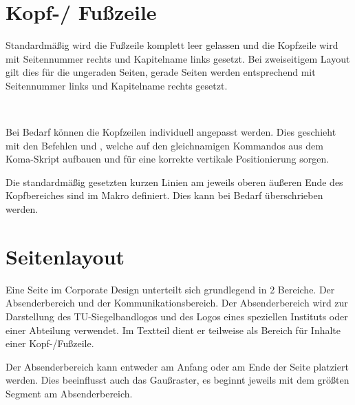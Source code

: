 \section{Kopf-/ Fußzeile}\label{sec:headline}

Standardmäßig wird die Fußzeile komplett leer gelassen und die Kopfzeile
wird mit Seitennummer rechts und Kapitelname links gesetzt. Bei zweiseitigem
Layout gilt dies für die ungeraden Seiten, gerade Seiten werden entsprechend
mit Seitennummer links und Kapitelname rechts gesetzt.

\begin{Declaration}
  \\
\end{Declaration}

Bei Bedarf können die Kopfzeilen individuell angepasst werden.
Dies geschieht mit den Befehlen  und , welche
auf den gleichnamigen Kommandos aus dem Koma-Skript aufbauen und für eine
korrekte vertikale Positionierung sorgen.

\begin{Declaration}
\end{Declaration}


Die standardmäßig gesetzten kurzen Linien am jeweils oberen äußeren Ende des
Kopfbereiches sind im Makro  definiert.
Dies kann bei Bedarf überschrieben werden.


\section{Seitenlayout}\label{sec:pagelayout}

Eine Seite im Corporate Design unterteilt sich grundlegend in 2 Bereiche.
Der Absenderbereich und der Kommunikationsbereich. Der Absenderbereich wird zur
Darstellung des TU-Siegelbandlogos und des Logos eines speziellen Instituts
oder einer Abteilung verwendet. Im Textteil dient er teilweise als Bereich für
Inhalte einer Kopf-/Fußzeile.

Der Absenderbereich kann entweder am Anfang oder am Ende der Seite platziert
werden. Dies beeinflusst auch das Gaußraster, es beginnt jeweils mit dem
größten Segment am Absenderbereich.

\begin{Declaration}
  \\
  \\
  \\
  \\
  \\
  \\
\end{Declaration}

